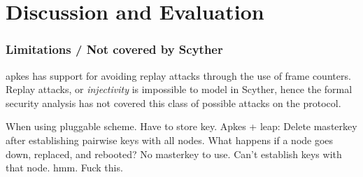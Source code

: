 \chapter{Discussion and Evaluation}
\label{chp:discussion}



\begin{table}[h]
\centering
{}
\caption{Table of the security properties that are satisfied in the different protocols.}
\label{tab:scyther-results}
\end{table}


\subsection{Limitations / Not covered by Scyther}


\gls{apkes} has support for avoiding replay attacks through the use of frame counters. Replay attacks, or \emph{injectivity} is impossible to model in Scyther, hence the formal security analysis has not covered this class of possible attacks on the protocol. 

When using pluggable scheme. Have to store key. Apkes + leap: Delete masterkey after establishing pairwise keys with all nodes. What happens if a node goes down, replaced, and rebooted? No masterkey to use. Can't establish keys with that node. hmm. Fuck this.
